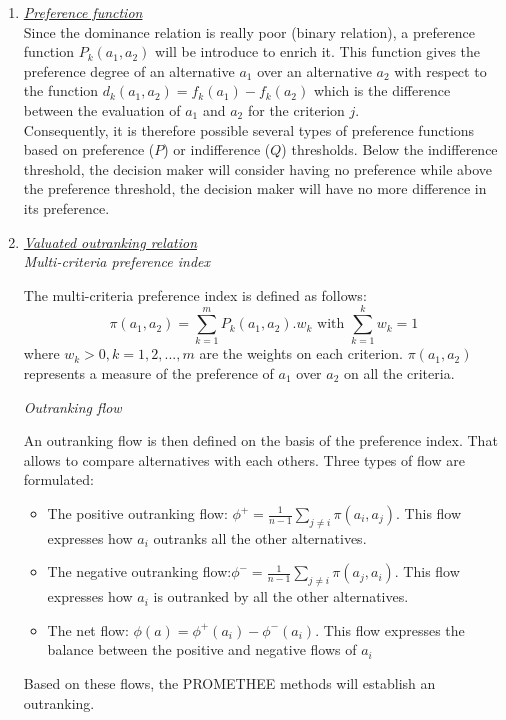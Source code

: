 \begin{enumerate}
\item \textit{\underline{Preference function}}\\
Since the dominance relation is really poor (binary relation), a preference function $P_k(a_1,a_2)$ will be introduce to enrich it. This function gives the preference degree of an alternative $a_1$ over an alternative $a_2$ with respect to the function $d_k(a_1,a_2) = f_k(a_1) - f_k(a_2)$ which is the difference between the evaluation of $a_1$ and $a_2$ for the criterion $j$.\\
Consequently, it is therefore possible several types of preference functions based on preference ($P$) or indifference ($Q$) thresholds. Below the indifference threshold, the decision maker will consider having no preference while above the preference threshold, the decision maker will have no more difference in its preference.

\item \textit{\underline{Valuated outranking relation}}\\
\textit{Multi-criteria preference index}

The multi-criteria preference index is defined as follows:
\begin{equation}
\pi (a_1, a_2) = \sum_{k=1}^{m} P_{k}(a_1, a_2).w_{k} \text{ with $\sum_{k=1}^{k} w_{k} = 1$}
\end{equation}
where $w_{k}>0, k=1, 2, ..., m$ are the weights on each criterion. $\pi (a_1, a_2)$ represents a measure of the preference of $a_1$ over $a_2$ on all the criteria.

\textit{Outranking flow}

An \og outranking flow \fg is then defined on the basis of the preference index. That allows to compare alternatives with each others. Three types of flow are formulated:
\begin{itemize}
\item The positive outranking flow: $\phi^ {+} = \frac{1}{n-1} \sum_{j \neq i} \pi (a_i, a_j)$. This flow expresses how $a_i$ outranks all the other alternatives.
\item The negative outranking flow:$\phi^ {-} = \frac{1}{n-1} \sum_{j \neq i} \pi (a_j, a_i)$. This flow expresses how $a_i$ is outranked by all the other alternatives.
\item The net flow: $\phi(a) = \phi^{+}(a_i) - \phi^{-}(a_i)$. This flow expresses the balance between the positive and negative flows of $a_i$
\end{itemize}
Based on these flows, the PROMETHEE methods will establish an outranking.


\end{enumerate}
